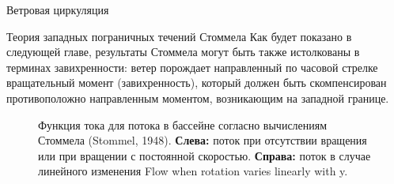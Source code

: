 \begin{chapter}{Ветровая циркуляция}
\begin{section}{Теория западных пограничных течений Стоммела}
Как будет показано в следующей главе, результаты Стоммела могут быть также
истолкованы в терминах завихренности: ветер порождает направленный по часовой
стрелке вращательный момент (завихренность), который должен быть скомпенсирован
противоположно направленным моментом, возникающим на западной границе.
%

\begin{figure}[h!]
\caption{Функция тока для потока в бассейне согласно вычислениям 
Стоммела (Stommel, 1948).  
\textbf{Слева:} поток при отсутствии вращения или при вращении с постоянной
скоростью. 
\textbf{Справа:} поток в случае линейного изменения Flow
when rotation varies linearly with y.}
\label{fig:stommelcurrents}
\end{figure}
%
\end{section}


\end{chapter}

